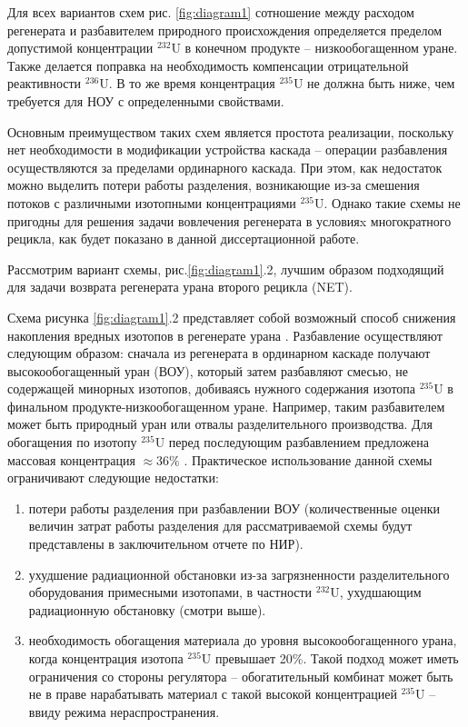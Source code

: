 Для всех вариантов схем рис. \ref{fig:diagram1} сотношение между расходом регенерата и разбавителем природного происхождения определяется пределом допустимой концентрации $^{232}$U в конечном продукте -- низкообогащенном уране. Также делается поправка на необходимость компенсации отрицательной реактивности $^{236}$U. В то же время концентрация $^{235}$U не должна быть ниже, чем требуется для НОУ с определенными свойствами.

Основным преимуществом таких схем является простота реализации, поскольку нет необходимости в модификации устройства каскада -- операции разбавления осуществляются за пределами  ординарного каскада. При этом, как недостаток можно выделить потери работы разделения, возникающие из-за смешения потоков с различными изотопными концентрациями $^{235}$U. 
Однако такие схемы не пригодны для решения задачи вовлечения регенерата в условияx многократного рецикла, как будет показано в данной диссертационной работе.

Рассмотрим вариант схемы, рис.\ref{fig:diagram1}.2, лучшим образом подходящий для задачи возврата регенерата урана второго рецикла (NET).

Схема рисунка \ref{fig:diagram1}.2 представляет собой возможный способ снижения накопления вредных изотопов в регенерате урана \cite{SposobIzotopnogoVosstanovleniyaa}. Разбавление осуществляют следующим образом: сначала из регенерата в ординарном каскаде получают высокообогащенный уран (ВОУ), который затем разбавляют смесью, не содержащей минорных изотопов, добиваясь нужного содержания изотопа $^{235}$U в финальном продукте-низкообогащенном уране. Например, таким разбавителем может быть природный уран или отвалы разделительного производства. Для обогащения по изотопу $^{235}$U перед последующим разбавлением предложена массовая концентрация $\approx$36\% \cite{SposobIzotopnogoVosstanovleniyaa}. Практическое использование данной схемы ограничивают следующие недостатки: 
\begin{enumerate}
  \item потери работы разделения при разбавлении ВОУ (количественные оценки величин затрат работы разделения для рассматриваемой схемы будут представлены в заключительном отчете по НИР).
  \item ухудшение радиационной обстановки из-за загрязненности разделительного оборудования примесными изотопами, в частности $^{232}$U, ухудшающим радиационную обстановку (смотри выше).
  \item необходимость обогащения материала до уровня высокообогащенного урана, когда концентрация изотопа $^{235}$U превышает 20\%. Такой подход может иметь ограничения со стороны регулятора -- обогатительный комбинат может быть не в праве нарабатывать материал с такой высокой концентрацией $^{235}$U -- ввиду режима нераспространения.
\end{enumerate}

